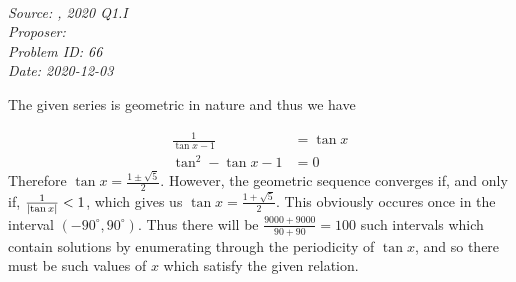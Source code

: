 \SSbreak\\
\emph{Source: \Cmat, 2020 Q1.I}\\
\emph{Proposer: \Pss}\\
\emph{Problem ID: 66}\\
\emph{Date: 2020-12-03}\\
\SSbreak

\bigskip

\begin{solution}\hfil\medskip

  The given series is geometric in nature and thus we have 
  
  \begin{align*}
    \frac{1}{\tan x-1}&=\tan x\\
    \tan^2-\tan x-1&=0
  \end{align*}
  Therefore \(\tan x =\frac{1\pm \sqrt{5}}{2}\). However, the geometric sequence converges if, and only if, \(\frac{1}{\left\lvert \tan x\right\rvert}<1\), which gives us \(\tan x=\frac{1+\sqrt{5}}{2}\). This obviously occures once in the interval \((-90^{\circ},90^{\circ})\). Thus there will be \(\frac{9000+9000}{90+90}=100\) such intervals which contain solutions by enumerating through the periodicity of \(\tan x\), and so there must be  such values of \(x\) which satisfy the given relation. 
\end{solution}\bigskip
